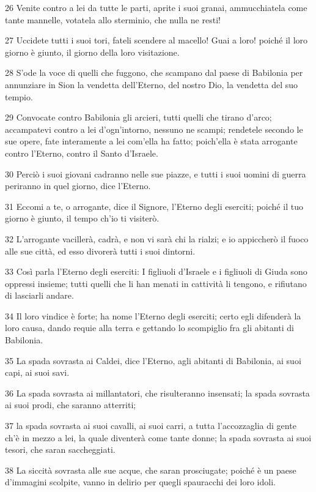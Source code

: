 \par 26 Venite contro a lei da tutte le parti, aprite i suoi granai, ammucchiatela come tante mannelle, votatela allo sterminio, che nulla ne resti!
\par 27 Uccidete tutti i suoi tori, fateli scendere al macello! Guai a loro! poiché il loro giorno è giunto, il giorno della loro visitazione.
\par 28 S'ode la voce di quelli che fuggono, che scampano dal paese di Babilonia per annunziare in Sion la vendetta dell'Eterno, del nostro Dio, la vendetta del suo tempio.
\par 29 Convocate contro Babilonia gli arcieri, tutti quelli che tirano d'arco; accampatevi contro a lei d'ogn'intorno, nessuno ne scampi; rendetele secondo le sue opere, fate interamente a lei com'ella ha fatto; poich'ella è stata arrogante contro l'Eterno, contro il Santo d'Israele.
\par 30 Perciò i suoi giovani cadranno nelle sue piazze, e tutti i suoi uomini di guerra periranno in quel giorno, dice l'Eterno.
\par 31 Eccomi a te, o arrogante, dice il Signore, l'Eterno degli eserciti; poiché il tuo giorno è giunto, il tempo ch'io ti visiterò.
\par 32 L'arrogante vacillerà, cadrà, e non vi sarà chi la rialzi; e io appiccherò il fuoco alle sue città, ed esso divorerà tutti i suoi dintorni.
\par 33 Così parla l'Eterno degli eserciti: I figliuoli d'Israele e i figliuoli di Giuda sono oppressi insieme; tutti quelli che li han menati in cattività li tengono, e rifiutano di lasciarli andare.
\par 34 Il loro vindice è forte; ha nome l'Eterno degli eserciti; certo egli difenderà la loro causa, dando requie alla terra e gettando lo scompiglio fra gli abitanti di Babilonia.
\par 35 La spada sovrasta ai Caldei, dice l'Eterno, agli abitanti di Babilonia, ai suoi capi, ai suoi savi.
\par 36 La spada sovrasta ai millantatori, che risulteranno insensati; la spada sovrasta ai suoi prodi, che saranno atterriti;
\par 37 la spada sovrasta ai suoi cavalli, ai suoi carri, a tutta l'accozzaglia di gente ch'è in mezzo a lei, la quale diventerà come tante donne; la spada sovrasta ai suoi tesori, che saran saccheggiati.
\par 38 La siccità sovrasta alle sue acque, che saran prosciugate; poiché è un paese d'immagini scolpite, vanno in delirio per quegli spauracchi dei loro idoli.
